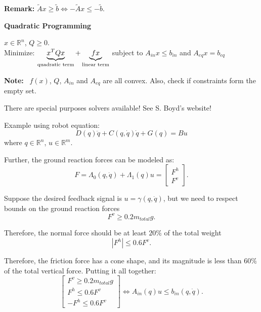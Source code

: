 \documentclass[letterpaper]{article}
\newcommand{\real}{\mathbb R}  %
\begin{document}
\textbf{Remark:} $\tilde{A}x \geq \tilde{b} \Leftrightarrow -\tilde{A}x \leq -\tilde{b}$.

\begin{center}\textbf{Quadratic Programming}\end{center}

    $x\in \real^n$, $Q\geq 0$.\\
    Minimize: $\underbrace{x^TQx}_{\textnormal{quadratic term}}+\underbrace{fx}_{\textnormal{linear term}}$ subject to $A_{in}x \leq b_{in}$ and $A_{eq}x = b_{eq}$
    
    \textbf{Note:}~ $f(x)$, $Q$, $A_{in}$ and $A_{eq}$ are all convex. Also, check if constraints form the empty set.
    
    There are special purposes solvers available! See S. Boyd's website!

    Example using robot equation:
        \begin{equation*}
            D(q)\ddot{q}+C(q,\dot{q})\dot{q}+G(q) = Bu
        \end{equation*}
    where $q \in \mathbb{R}^n$, $u\in \mathbb{R}^m$.
    
    Further, the ground reaction forces can be modeled as:
        \begin{equation*}
            F = \Lambda_0(q,\dot{q})+\Lambda_1(q)u = \left[ \begin{array}{c}
												F^h \\
                                                F^v \end{array} \right].
        \end{equation*}
        
    Suppose the desired feedback signal is $u=\gamma(q,\dot{q})$, but we need to respect bounds on the ground reaction forces
        \begin{equation*}
            F^v \geq 0.2m_{total}g.
        \end{equation*}
        
    Therefore, the normal force should be at least $20\%$ of the total weight
        \begin{equation*}
            |F^h| \leq 0.6F^v.
        \end{equation*}
        
    Therefore, the friction force has a cone shape, and its magnitude is less than $60\%$ of the total vertical force. Putting it all together:
        \begin{equation*}
            \left[ \begin{array}{c}
		        F^v \geq 0.2m_{total}g\\
                F^h \leq 0.6F^v\\
                -F^h \leq 0.6F^v\end{array} \right]
                \Leftrightarrow A_{in} (q)u\leq b_{in}(q,\dot{q}).
        \end{equation*}
\end{document}
